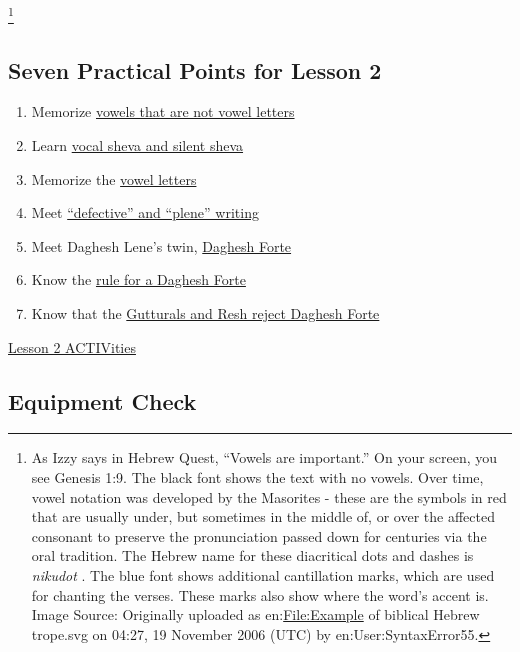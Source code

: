 \documentclass[
]{turabian-researchpaper}
\providecommand{\tightlist}{%
  \setlength{\itemsep}{0pt}\setlength{\parskip}{0pt}}
\begin{document}
\footnote{As Izzy says in Hebrew Quest, ``Vowels are important.'' On your screen, you see Genesis 1:9. The black font shows the text with no vowels. Over time, vowel notation was developed by the Masorites - these are the symbols in red that are usually under, but sometimes in the middle of, or over the affected consonant to preserve the pronunciation passed down for centuries via the oral tradition. The Hebrew name for these diacritical dots and dashes is \emph{nikudot} . The blue font shows additional cantillation marks, which are used for chanting the verses. These marks also show where the word's accent is.\\
  Image Source: Originally uploaded as en:\url{File:Example} of biblical Hebrew trope.svg on 04:27, 19 November 2006 (UTC) by en:User:SyntaxError55.}

\hypertarget{seven-practical-points-for-lesson-2}{%
\subsection*{Seven Practical Points for Lesson 2}\label{seven-practical-points-for-lesson-2}}

\begin{enumerate}
\def\labelenumi{\arabic{enumi}.}
\tightlist
\item
  Memorize \protect\hyperlink{two_1}{vowels that are not vowel letters}
\item
  Learn \protect\hyperlink{two_2}{vocal sheva and silent sheva}
\item
  Memorize the \protect\hyperlink{two_3}{vowel letters}
\item
  Meet \protect\hyperlink{two_4}{``defective'' and ``plene'' writing}
\item
  Meet Daghesh Lene's twin, \protect\hyperlink{two_5}{Daghesh Forte}
\item
  Know the \protect\hyperlink{two_6}{rule for a Daghesh Forte}
\item
  Know that the \protect\hyperlink{two_7}{Gutturals and Resh reject Daghesh Forte}
\end{enumerate}

\protect\hyperlink{two_8}{Lesson 2 ACTIVities}

\hypertarget{equipment-check}{%
\subsection*{Equipment Check}\label{equipment-check}}
\end{document}
